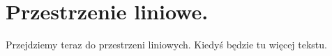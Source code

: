 \chapter{Przestrzenie liniowe.}

Przejdziemy teraz do przestrzeni liniowych.
Kiedyś będzie tu więcej tekstu.






